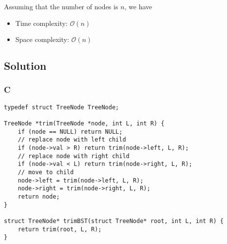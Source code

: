 Assuming that the number of nodes is $n$, we have
\begin{itemize}
    \item Time complexity: $\mathcal{O}(n)$
    \item Space complexity: $\mathcal{O}(n)$
\end{itemize}

\subsection*{Solution}
\subsubsection{C}
\begin{verbatim}
typedef struct TreeNode TreeNode;

TreeNode *trim(TreeNode *node, int L, int R) {
    if (node == NULL) return NULL;
    // replace node with left child
    if (node->val > R) return trim(node->left, L, R);
    // replace node with right child
    if (node->val < L) return trim(node->right, L, R);
    // move to child
    node->left = trim(node->left, L, R);
    node->right = trim(node->right, L, R);
    return node;
}

struct TreeNode* trimBST(struct TreeNode* root, int L, int R) {
    return trim(root, L, R);
}
\end{verbatim}

\newpage

